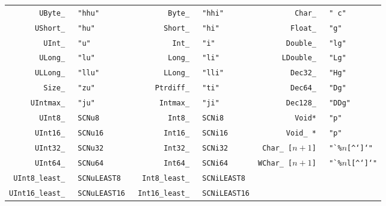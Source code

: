 \noindent
\begin{tabular*}{\textwidth}{@{\extracolsep{\fill}}rl|rl|rl}

       \tt{UByte_} & \tt{"hhu"}       &        \tt{Byte_} & \tt{"hhi"}  & \tt{Char_}                  & \tt{" c"}\\

      \tt{UShort_} & \tt{"hu"}        &       \tt{Short_} & \tt{"hi"}   & \tt{Float_}                 & \tt{"g"}\\

        \tt{UInt_} & \tt{"u"}         &         \tt{Int_} & \tt{"i"}    & \tt{Double_}                & \tt{"lg"}\\

       \tt{ULong_} & \tt{"lu"}        &        \tt{Long_} & \tt{"li"}   & \tt{LDouble_}               & \tt{"Lg"}\\

      \tt{ULLong_} & \tt{"llu"}       &       \tt{LLong_} & \tt{"lli"}  & \tt{Dec32_}                 & \tt{"Hg"}\\

        \tt{Size_} & \tt{"zu"}        &     \tt{Ptrdiff_} & \tt{"ti"}   & \tt{Dec64_}                 & \tt{"Dg"}\\

     \tt{UIntmax_} & \tt{"ju"}        &      \tt{Intmax_} & \tt{"ji"}   & \tt{Dec128_}                & \tt{"DDg"}\\

       \tt{UInt8_} & \tt{SCNu8}       &        \tt{Int8_} & \tt{SCNi8}  & \tt{Void}\s\s\tt{*}         & \tt{"p"}\\

      \tt{UInt16_} & \tt{SCNu16}      &       \tt{Int16_} & \tt{SCNi16} & \tt{Void_ *}                & \tt{"p"}\\

      \tt{UInt32_} & \tt{SCNu32}      &       \tt{Int32_} & \tt{SCNi32} & \tt{\ Char_ [}$n + 1$\tt{]} & \tt{"`\%}$n$\tt{[^`]`"}\\

      \tt{UInt64_} & \tt{SCNu64}      &       \tt{Int64_} & \tt{SCNi64} & \tt {WChar_ [}$n + 1$\tt{]} & \tt{"`\%}$n$\tt{l[^`]`"}\\

 \tt{UInt8_least_} & \tt{SCNuLEAST8}  &  \tt{Int8_least_} & \tt{SCNiLEAST8}\\

\tt{UInt16_least_} & \tt{SCNuLEAST16} & \tt{Int16_least_} & \tt{SCNiLEAST16}\\


\end{tabular*}
